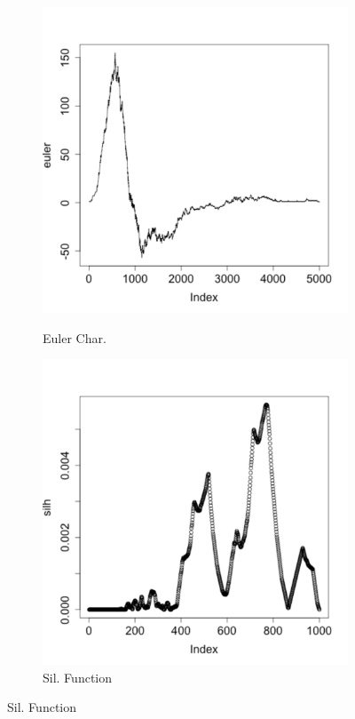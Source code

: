 \documentclass[12pt]{article}
\begin{document}
\begin{figure}[htbp]
\begin{subfigure}{.24\textwidth}
    \label{fig:examplestest2}
  \end{subfigure}
    \begin{subfigure}{.24\textwidth}
    \centering
        \caption{Euler Char.}   \includegraphics[width=\linewidth]{test_pics_3.pdf}
    \label{fig:examplestest3}
  \end{subfigure}
    \begin{subfigure}{.24\textwidth}
    \centering
        \caption{Sil. Function}       \includegraphics[width=\linewidth]{test_pics_4.pdf}

\end{subfigure}
\end{figure}
\end{document}
